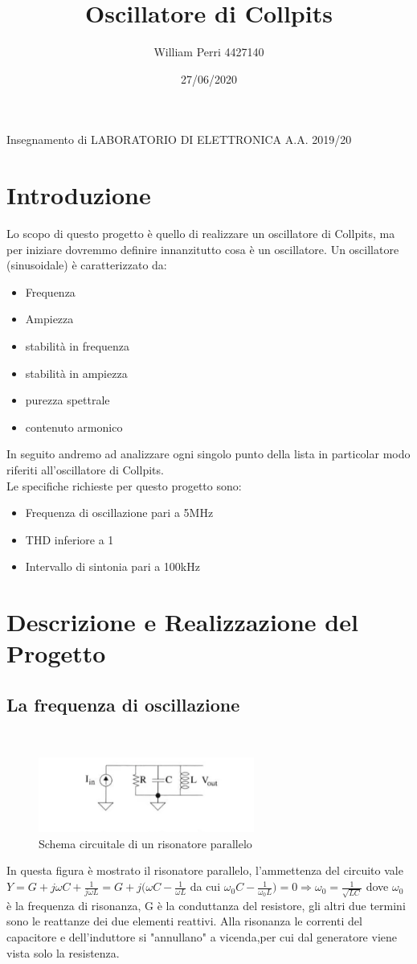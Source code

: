 \documentclass{article}
\title{Oscillatore di Collpits}
\author{William Perri 4427140 }
\date{27/06/2020}
\newcommand\tab[1][1cm]{\hspace*{#1}}
\begin{document}
\maketitle
\tab \tab \tab Insegnamento di LABORATORIO DI ELETTRONICA A.A. 2019/20

\newpage
\tableofcontents
\newpage
\section{Introduzione}
Lo scopo di questo progetto è quello di realizzare un oscillatore di Collpits, ma per iniziare dovremmo definire innanzitutto cosa è un oscillatore.
Un oscillatore (sinusoidale) è caratterizzato da:
\begin{itemize}
\item Frequenza
\item Ampiezza
\item stabilità in frequenza
\item stabilità in ampiezza
\item purezza spettrale
\item contenuto armonico
\end{itemize}
In seguito andremo ad analizzare ogni singolo punto della lista in particolar modo riferiti all'oscillatore di Collpits.\\
Le specifiche richieste per questo progetto sono:
\begin{itemize}
\item Frequenza di oscillazione pari a 5MHz
\item THD inferiore a 1%
\item Intervallo di sintonia pari a 100kHz
\end{itemize}
\newpage
\section{Descrizione e Realizzazione del Progetto}
\subsection{La frequenza di oscillazione}
~\begin{figure}[H]
\includegraphics[scale=2]{RisonatoreParallelo.png} 
\centering
\caption{Schema circuitale di un risonatore parallelo}
\label{fig:foo}
\end{figure}
In questa figura è mostrato il risonatore parallelo, l'ammettenza del circuito vale 
$Y=G+j\omega C+\frac{1}{j\omega L}=G+j(\omega C-\frac{1}{\omega L}$ da cui $\omega_0C-\frac{1}{\omega _0L})=0 \Rightarrow \omega _0=\frac{1}{\sqrt{LC}}$ dove $\omega _0$ è la frequenza di risonanza, G è la conduttanza del resistore, gli altri due termini sono le reattanze dei due elementi reattivi.
Alla risonanza le correnti del capacitore e dell'induttore si "annullano" a vicenda,per cui dal generatore viene vista solo la resistenza. 
\end{document}
